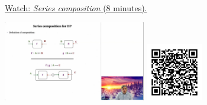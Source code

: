 
\begin{minipage}{10cm}
    \href{https://act4e-spring21.netlify.app/videos/spring2021-functorial-comp-b:solving-queries:solving-series.html}{Watch: \emph{Series composition} (8 minutes).}
        
    \href{https://act4e-spring21.netlify.app/videos/spring2021-functorial-comp-b:solving-queries:solving-series.html}{\includegraphics[height=3.5cm]{spring2021-functorial-comp-b:solving-queries:solving-series/thumbnails.jpg}}
    \href{https://act4e-spring21.netlify.app/videos/spring2021-functorial-comp-b:solving-queries:solving-series.html}{\includegraphics[height=2.5cm]{spring2021-functorial-comp-b:solving-queries:solving-series/qrcode.png}}
\end{minipage}
